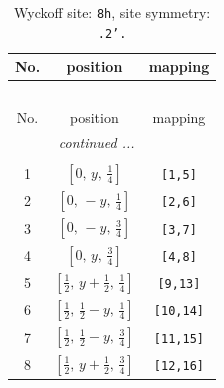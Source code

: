 \documentclass[fleqn,8pt]{jsarticle}
\begin{document}
\begin{longtable}{ccc}
\caption{Wyckoff site: {\tt 8h}, site symmetry: {\tt .2'.}}
 \\
 \hline \hline
No. & position & mapping \\ \hline \endfirsthead

\multicolumn{2}{l}{\tablename\ \thetable{}} \\
 \hline \hline
No. & position & mapping \\ \hline \endhead

 \hline \hline
\multicolumn{2}{r}{\footnotesize\it continued ...} \\ \endfoot

 \hline \hline
\multicolumn{2}{r}{} \\ \endlastfoot

1 & $\left[ 0,\, y,\, \frac{1}{4} \right]$ & {\tt [1,5]} \\ \hline
2 & $\left[ 0,\, - y,\, \frac{1}{4} \right]$ & {\tt [2,6]} \\ \hline
3 & $\left[ 0,\, - y,\, \frac{3}{4} \right]$ & {\tt [3,7]} \\ \hline
4 & $\left[ 0,\, y,\, \frac{3}{4} \right]$ & {\tt [4,8]} \\ \hline
5 & $\left[ \frac{1}{2},\, y + \frac{1}{2},\, \frac{1}{4} \right]$ & {\tt [9,13]} \\ \hline
6 & $\left[ \frac{1}{2},\, \frac{1}{2} - y,\, \frac{1}{4} \right]$ & {\tt [10,14]} \\ \hline
7 & $\left[ \frac{1}{2},\, \frac{1}{2} - y,\, \frac{3}{4} \right]$ & {\tt [11,15]} \\ \hline
8 & $\left[ \frac{1}{2},\, y + \frac{1}{2},\, \frac{3}{4} \right]$ & {\tt [12,16]} \\
\end{longtable}
\renewcommand{\arraystretch}{1.2}
\end{document}
